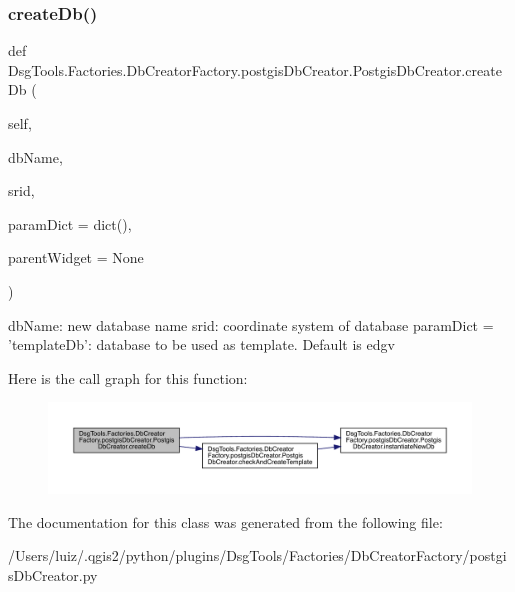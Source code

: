 \subsubsection{\texorpdfstring{create\+Db()}{createDb()}}
{\footnotesize\ttfamily def Dsg\+Tools.\+Factories.\+Db\+Creator\+Factory.\+postgis\+Db\+Creator.\+Postgis\+Db\+Creator.\+create\+Db (\begin{DoxyParamCaption}\item[{}]{self,  }\item[{}]{db\+Name,  }\item[{}]{srid,  }\item[{}]{param\+Dict = {\ttfamily dict()},  }\item[{}]{parent\+Widget = {\ttfamily None} }\end{DoxyParamCaption})}

\begin{DoxyVerb}dbName: new database name
srid: coordinate system of database
paramDict = {'templateDb': database to be used as template. Default is edgv}
\end{DoxyVerb}
 Here is the call graph for this function\+:
\nopagebreak
\begin{figure}[H]
\begin{center}
\leavevmode
\includegraphics[width=350pt]{class_dsg_tools_1_1_factories_1_1_db_creator_factory_1_1postgis_db_creator_1_1_postgis_db_creator_a651236665f823f015e669345182f60dc_cgraph}
\end{center}
\end{figure}


The documentation for this class was generated from the following file\+:\begin{DoxyCompactItemize}
\item 
/\+Users/luiz/.\+qgis2/python/plugins/\+Dsg\+Tools/\+Factories/\+Db\+Creator\+Factory/postgis\+Db\+Creator.\+py\end{DoxyCompactItemize}
